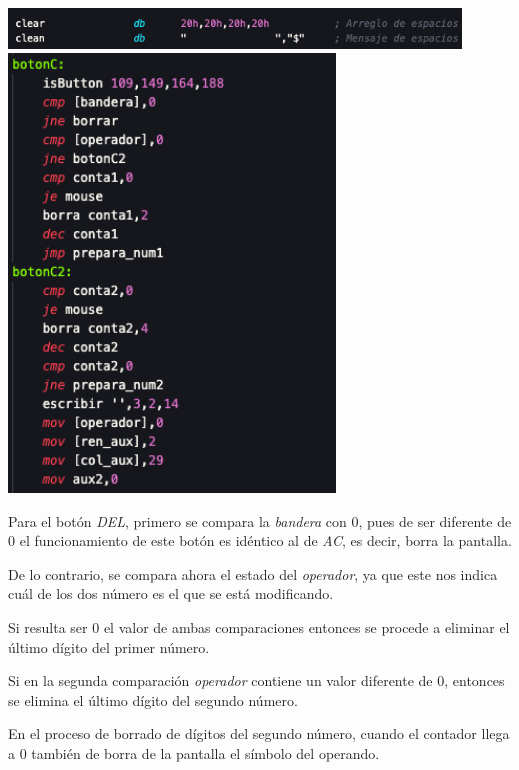 \documentclass[letterpaper,12 pt,titlepage]{article}
\begin{document}
    \begin{center}
        \includegraphics[width=0.9\textwidth]{img/31.png}
        \includegraphics[width=0.65\textwidth]{img/32.png}
    \end{center}

    Para el botón \textit{DEL}, primero se compara la \textit{bandera} con $0$, pues de ser diferente de 0 el funcionamiento de este botón es idéntico al de \textit{AC}, es decir, borra la pantalla.

    De lo contrario, se compara ahora el estado del \textit{operador}, ya que este nos indica cuál de los dos número es el que se está modificando.

    Si resulta ser $0$ el valor de ambas comparaciones entonces se procede a eliminar el último dígito del primer número.

    Si en la segunda comparación \textit{operador} contiene un valor diferente de $0$, entonces se elimina el último dígito del segundo número.

    En el proceso de borrado de dígitos del segundo número, cuando el contador llega a $0$ también de borra de la pantalla el símbolo del operando.
\end{document}
